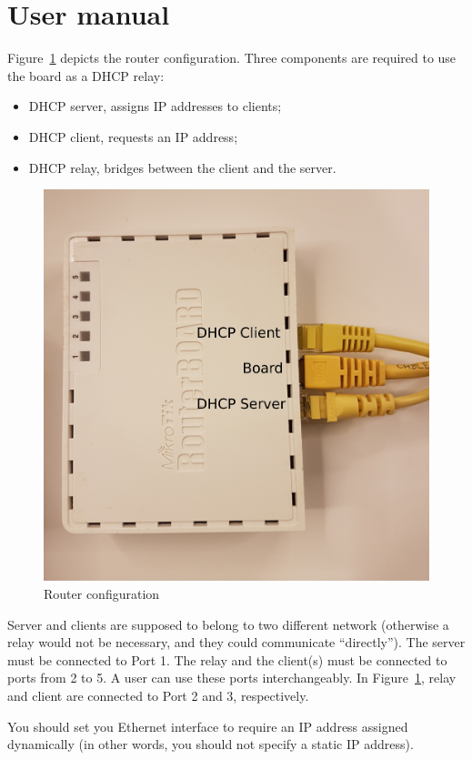 \section{User manual}
Figure~\ref{fig:router} depicts the router configuration. Three components are required to use the board as a DHCP relay:
\begin{itemize}
	\item DHCP server, assigns IP addresses to clients;
	\item DHCP client, requests an IP address;
	\item DHCP relay, bridges between the client and the server.
\end{itemize}

\begin{figure}[h]
	\centering
	\includegraphics[scale=0.1]{images/router}
	\caption{Router configuration}
	\label{fig:router}
\end{figure}

Server and clients are supposed to belong to two different network (otherwise a relay would not be necessary, and they could communicate ``directly''). The server must be connected to Port 1. The relay and the client(s) must be connected to ports from 2 to 5. A user can use these ports interchangeably. In Figure~\ref{fig:router}, relay and client are connected to Port 2 and 3, respectively. 

You should set you Ethernet interface to require an IP address assigned dynamically (in other words, you should not specify a static IP address).